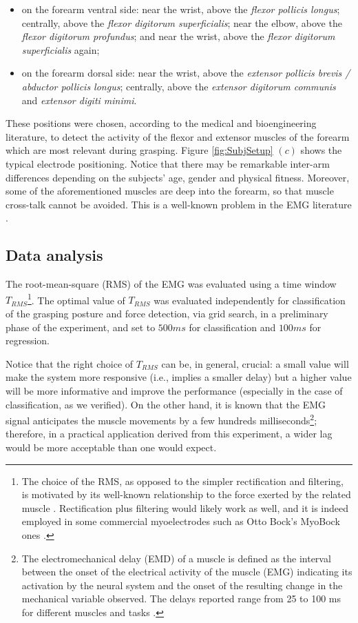 \documentclass[10pt]{bmc_article}
\newenvironment{bmcformat}{\begin{raggedright}\baselineskip20pt\sloppy\setboolean{publ}{false}}{\end{raggedright}\baselineskip20pt\sloppy}
\begin{document}
\begin{bmcformat}
\begin{itemize}
  \item on the forearm ventral side: near the wrist, above the
    \emph{flexor pollicis longus}; centrally, above the \emph{flexor
    digitorum superficialis}; near the elbow, above the \emph{flexor
    digitorum profundus}; and near the wrist, above the \emph{flexor
    digitorum superficialis} again;

  \item on the forearm dorsal side: near the wrist, above the
    \emph{extensor pollicis brevis / abductor pollicis longus};
    centrally, above the \emph{extensor digitorum communis} and
    \emph{extensor digiti minimi}.

\end{itemize}

These positions were chosen, according to the medical \cite{Kendall} and
bioengineering \cite{kampas} literature, to detect the activity of the flexor
and extensor muscles of the forearm which are most relevant during grasping.
Figure \ref{fig:SubjSetup} $(c)$ shows
the typical electrode positioning. Notice that there may be remarkable
inter-arm differences depending on the subjects' age, gender and physical
fitness. Moreover, some of the aforementioned muscles are deep into
the forearm, so that muscle cross-talk cannot be avoided. This is a
well-known problem in the EMG literature \cite{deluca97,zecca}.

\subsection*{Data analysis}

The root-mean-square (RMS) of the EMG was evaluated using a time window
$T_{RMS}$\footnote{The choice of the RMS, as opposed
to the simpler rectification and filtering,
is motivated by its well-known relationship to the force exerted
by the related muscle \cite{deluca97,deluca02,zecca}. Rectification plus filtering
would likely work as well, and it is indeed employed in some commercial myoelectrodes
such as Otto Bock's MyoBock ones \cite{ottobock}.}. The optimal value
of $T_{RMS}$ was evaluated independently for classification of the grasping
posture and force detection, via grid search, in a preliminary phase of the
experiment, and set to $500ms$ for classification and $100ms$ for regression.

Notice that the right choice of $T_{RMS}$ can be, in general,
crucial: a small value will make the system more responsive (i.e., implies
a smaller delay) but a higher value will be more informative and improve the
performance (especially in the case of classification, as we verified).
On the other hand, it is known that the EMG signal anticipates the muscle
movements by a few hundreds milliseconds\footnote{The
electromechanical delay (EMD) of a muscle is defined as the interval
between the onset of the electrical activity of the muscle (EMG)
indicating its activation by the neural system and the onset of the
resulting change in the mechanical variable observed. The delays
reported range from 25 to 100 ms for different muscles and tasks
\cite{Wolf1994}.}; therefore, in a practical application derived from this
experiment, a wider lag would be more acceptable than one would expect.


\end{bmcformat}
\end{document}
